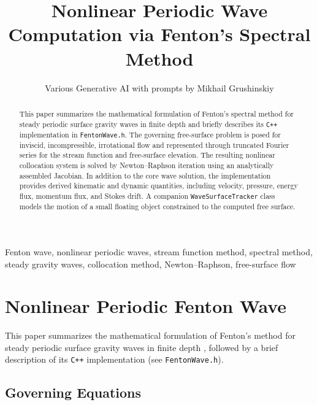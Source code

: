 \documentclass[journal,10pt,twocolumn]{IEEEtran}
\title{Nonlinear Periodic Wave Computation via Fenton's Spectral Method}
\author{Various Generative AI with prompts by Mikhail Grushinskiy}
\begin{document}
    \maketitle

    \begin{abstract}
        This paper summarizes the mathematical formulation of Fenton's spectral method for steady periodic surface gravity waves in finite depth and briefly describes its \texttt{C++} implementation in \texttt{FentonWave.h}. The governing free-surface problem is posed for inviscid, incompressible, irrotational flow and represented through truncated Fourier series for the stream function and free-surface elevation. The resulting nonlinear collocation system is solved by Newton--Raphson iteration using an analytically assembled Jacobian. In addition to the core wave solution, the implementation provides derived kinematic and dynamic quantities, including velocity, pressure, energy flux, momentum flux, and Stokes drift. A companion \texttt{WaveSurfaceTracker} class models the motion of a small floating object constrained to the computed free surface.
    \end{abstract}

    \begin{IEEEkeywords}
        Fenton wave, nonlinear periodic waves, stream function method, spectral method, steady gravity waves, collocation method, Newton--Raphson, free-surface flow
    \end{IEEEkeywords}

    \section{Nonlinear Periodic Fenton Wave}
    \label{sec:fenton_method}

    This paper summarizes the mathematical formulation of Fenton's method for steady periodic surface gravity waves in finite depth \cite{Fenton1988}, followed by a brief description of its \texttt{C++} implementation (see \texttt{FentonWave.h}).

    \subsection{Governing Equations}
\end{document}
